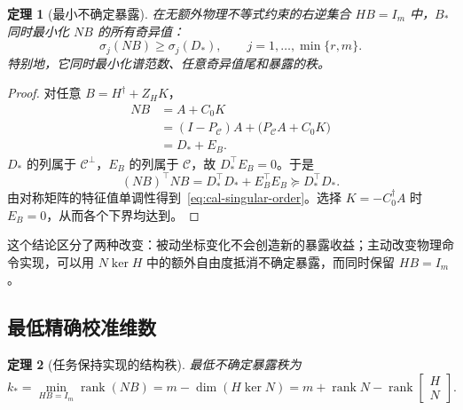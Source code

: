 \documentclass[11pt,a4paper]{article}
\numberwithin{equation}{section}
\newtheorem{theorem}{定理}[section]
\theoremstyle{definition}
\begin{document}
\begin{theorem}[最小不确定暴露]
\label{thm:cal-singular-opt}
在无额外物理不等式约束的右逆集合 $HB=I_m$ 中，$B_*$ 同时最小化 $NB$ 的所有奇异值：
\begin{equation}
  \sigma_j(NB)\ge\sigma_j(D_*),
  \qquad j=1,\ldots,\min\{r,m\}.
  \label{eq:cal-singular-order}
\end{equation}
特别地，它同时最小化谱范数、任意奇异值尾和暴露的秩。
\end{theorem}

\begin{proof}
对任意 $B=H^\dagger+Z_HK$，
\begin{align}
  NB
  &= A+C_0K\\
  &= (I-P_{\mathcal C})A+
     \big(P_{\mathcal C}A+C_0K\big)\\
  &=D_*+E_B .
\end{align}
$D_*$ 的列属于 $\mathcal C^\perp$，$E_B$ 的列属于 $\mathcal C$，故 $D_*^\top E_B=0$。于是
\begin{equation}
  (NB)^\top NB
  =D_*^\top D_*+E_B^\top E_B
  \succeq D_*^\top D_* .
\end{equation}
由对称矩阵的特征值单调性得到~\eqref{eq:cal-singular-order}。选择 $K=-C_0^\dagger A$ 时 $E_B=0$，从而各个下界均达到。
\end{proof}

这个结论区分了两种改变：被动坐标变化不会创造新的暴露收益；主动改变物理命令实现，可以用 $N\ker H$ 中的额外自由度抵消不确定暴露，而同时保留 $HB=I_m$。

\subsection{最低精确校准维数}

\begin{theorem}[任务保持实现的结构秩]
\label{thm:cal-rank}
最低不确定暴露秩为
\begin{equation}
  \boxed{
  k_*=
  \min_{HB=I_m}\operatorname{rank}(NB)
  =m-\dim(H\ker N)
  =m+\operatorname{rank}N-
  \operatorname{rank}
  \begin{bmatrix}H\\N\end{bmatrix}.}
  \label{eq:cal-kstar}
\end{equation}
\end{theorem}
\end{document}
